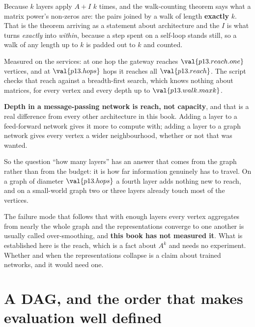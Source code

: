 \begin{fr}
Because $k$ layers apply $A + I$ $k$ times, and the walk-counting theorem
says what a matrix power's non-zeros are: the pairs joined by a walk of length
\textbf{exactly} $k$. That is the theorem arriving as a statement about
architecture \dash{} and the $I$ is what turns \emph{exactly} into
\emph{within}, because a step spent on a self-loop stands still, so a walk of
any length up to $k$ is padded out to $k$ and counted.

Measured on the services: at one hop the gateway reaches
$\val{p13.reach.one}$ vertices, and at $\val{p13.hops}$ hops it reaches all
$\val{p13.reach}$. The script checks that reach against a breadth-first
search, which knows nothing about matrices, for every vertex and every depth
up to $\val{p13.walk.maxk}$.

\begin{aibox}
\textbf{Depth in a message-passing network is reach, not capacity}, and that
is a real difference from every other architecture in this book. Adding a
layer to a feed-forward network gives it more to compute with; adding a layer
to a graph network gives every vertex a wider neighbourhood, whether or not
that was wanted.

So the question \enquote{how many layers} has an answer that comes from the
graph rather than from the budget: it is how far information genuinely has to
travel. On a graph of diameter $\val{p13.hops}$ a fourth layer adds nothing
new to reach, and on a small-world graph two or three layers already touch
most of the vertices.
\end{aibox}

\begin{warning}
The failure mode that follows \dash{} that with enough layers every vertex
aggregates from nearly the whole graph and the representations converge to one
another \dash{} is usually called over-smoothing, and \textbf{this book has not
measured it}. What is established here is the reach, which is a fact about
$A^{k}$ and needs no experiment. Whether and when the representations collapse
is a claim about trained networks, and it would need one.
\end{warning}
\end{fr}

\section{A DAG, and the order that makes evaluation well defined}
\label{sec:P13-dag}

